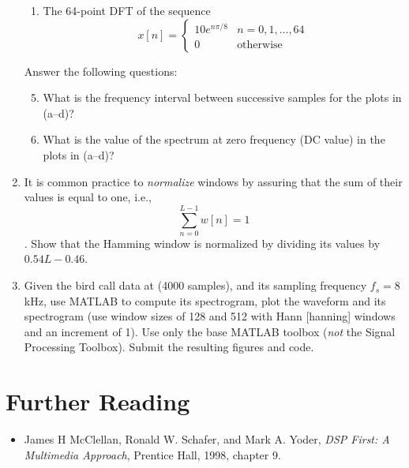 \begin{enumerate}
\begin{enumerate}
\item The 64-point DFT of the sequence 
\begin{equation*}
x[n]=\left\{\begin{array}{ll}
                        10e^{n\pi/8}  & n=0,1,\ldots,64 \\
                        0             & \text{otherwise}
           \end{array}\right.
\end{equation*}
\end{enumerate}

Answer the following questions:
\begin{enumerate}\setcounter{enumii}{4}
\item What is the frequency interval between successive samples for the
plots in (a--d)?

\item What is the value of the spectrum at zero frequency (DC value)
in the plots in (a--d)?
\end{enumerate}

\item It is common practice to \emph{normalize} windows by assuring
that the sum of their values is equal to one, i.e.,
\[ \sum_{n=0}^{L-1} w[n] = 1 \]. Show that the Hamming window is
normalized by dividing its values by $0.54L-0.46$.
\item Given the bird call data at
(4000 samples), and its sampling frequency $f_s=8$kHz, use MATLAB to
compute its spectrogram, plot the waveform and its spectrogram (use
window sizes of 128 and 512 with Hann [hanning] windows and an
increment of 1). Use only the base MATLAB toolbox (\emph{not} the
Signal Processing Toolbox). Submit the resulting figures and code.
\end{enumerate}

\section{Further Reading}

\begin{itemize}
\item James H McClellan, Ronald W. Schafer, and Mark A. Yoder,
  \textit{DSP First: A Multimedia Approach}, Prentice Hall, 1998,
  chapter 9.
\end{itemize}


